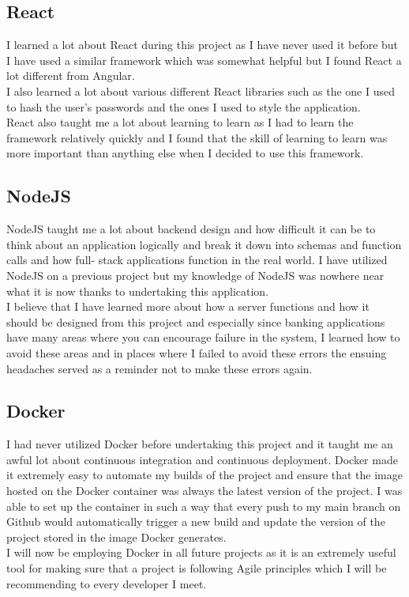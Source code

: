 \subsection{React}
I learned a lot about React during this project as I have never used it before but I
have used a similar framework which was somewhat helpful but I found React a lot different
from Angular.
\\
I also learned a lot about various different React libraries such as the one I used to
hash the user's passwords and the ones I used to style the application.
\\
React also taught me a lot about learning to learn as I had to learn the framework
relatively quickly and I found that the skill of learning to learn was more important
than anything else when I decided to use this framework.
\subsection{NodeJS}
NodeJS taught me a lot about backend design and how difficult it can be to think about
an application logically and break it down into schemas and function calls and how full-
stack applications function in the real world.  I have utilized NodeJS on a previous project
but my knowledge of NodeJS was nowhere near what it is now thanks to undertaking this application.
\\
I believe that I have learned more about how a server functions and how it should be designed from this
project and especially since banking applications have many areas where you can encourage failure in the
system, I learned how to avoid these areas and in places where I failed to avoid these errors the ensuing
headaches served as a reminder not to make these errors again.
\subsection{Docker}
I had never utilized Docker before undertaking this project and it taught me an
awful lot about continuous integration and continuous deployment.  Docker made it
extremely easy to automate my builds of the project and ensure that the image hosted
on the Docker container was always the latest version of the project.  I was able to
set up the container in such a way that every push to my main branch on Github would
automatically trigger a new build and update the version of the project stored in the
image Docker generates.
\\
I will now be employing Docker in all future projects as it is an extremely useful tool
for making sure that a project is following Agile principles
which I will be recommending to every developer I meet.
